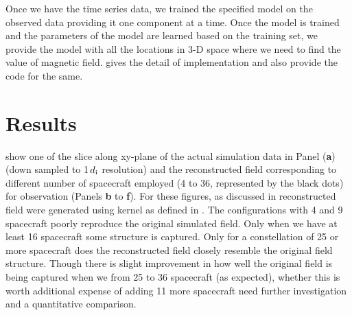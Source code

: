         Once we have the time series data, we trained the specified model on the observed data
        providing it one component at a time. Once the model is trained and the parameters of the
        model are learned based on the training set, we provide the model with all the locations in
        3-D space where we need to find the value of magnetic field.  gives the detail
        of implementation and also provide the code for the same.
    
    \section{Results} \label{sec:diss8}

         show one of the slice along xy-plane of the
        actual simulation data in Panel (\textbf{a}) (down sampled to 1\,$d_{\rm i}$ resolution) and
        the reconstructed field corresponding to different number of spacecraft employed (4 to 36,
        represented by the black dots) for observation (Panels \textbf{b} to \textbf{f}). For these
        figures, as discussed in  reconstructed field were generated using kernel as
        defined in . The configurations with 4 and 9 spacecraft poorly
        reproduce the original simulated field. Only when we have at least 16 spacecraft some
        structure is captured. Only for a constellation of 25 or more spacecraft does the
        reconstructed field closely resemble the original field structure. Though there is slight
        improvement in how well the original field is being captured when we  from 25 to 36
        spacecraft (as expected), whether this is worth additional expense of adding 11 more
        spacecraft need further investigation and a quantitative comparison.

